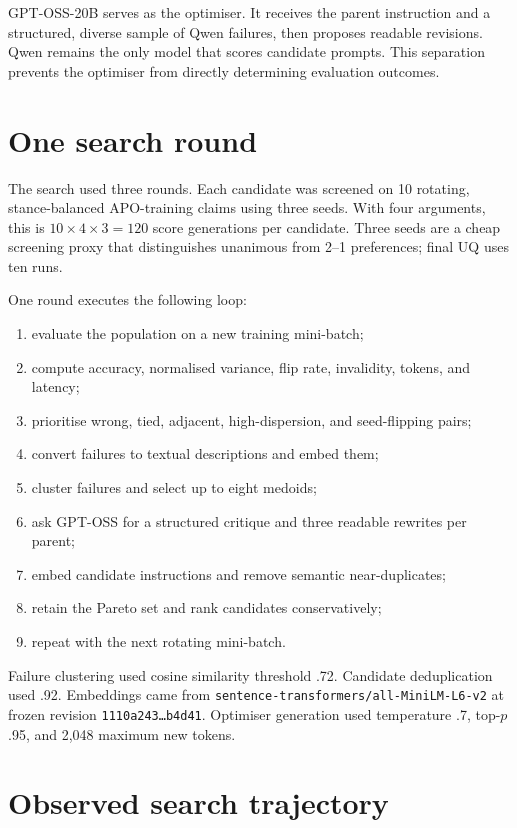 \documentclass[11pt,twoside,a4paper]{report}
\begin{document}
GPT-OSS-20B serves as the optimiser.  It receives the parent instruction and a
structured, diverse sample of Qwen failures, then proposes readable revisions.  Qwen
remains the only model that scores candidate prompts.  This separation prevents the
optimiser from directly determining evaluation outcomes.

\section{One search round}

The search used three rounds.  Each candidate was screened on 10 rotating,
stance-balanced APO-training claims using three seeds.  With four arguments, this is
$10\times4\times3=120$ score generations per candidate.  Three seeds are a cheap
screening proxy that distinguishes unanimous from 2--1 preferences; final UQ uses
ten runs.

One round executes the following loop:
\begin{enumerate}
  \item evaluate the population on a new training mini-batch;
  \item compute accuracy, normalised variance, flip rate, invalidity, tokens, and
  latency;
  \item prioritise wrong, tied, adjacent, high-dispersion, and seed-flipping pairs;
  \item convert failures to textual descriptions and embed them;
  \item cluster failures and select up to eight medoids;
  \item ask GPT-OSS for a structured critique and three readable rewrites per parent;
  \item embed candidate instructions and remove semantic near-duplicates;
  \item retain the Pareto set and rank candidates conservatively;
  \item repeat with the next rotating mini-batch.
\end{enumerate}

Failure clustering used cosine similarity threshold .72.  Candidate deduplication
used .92.  Embeddings came from
\texttt{sentence-transformers/all-MiniLM-L6-v2} at frozen revision
\texttt{1110a243\ldots b4d41}.  Optimiser generation used temperature .7, top-$p$
.95, and 2,048 maximum new tokens.

\section{Observed search trajectory}
\end{document}
